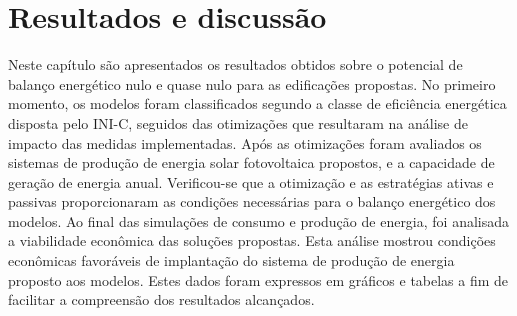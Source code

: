 \section{Resultados e discussão}
\noindent Neste capítulo são apresentados os resultados obtidos sobre o potencial de balanço energético nulo e quase nulo para as edificações propostas. No primeiro momento, os modelos foram classificados segundo a classe de eficiência energética disposta pelo INI-C, seguidos das otimizações que resultaram na análise de impacto das medidas implementadas. Após as otimizações foram avaliados os sistemas de produção de energia solar fotovoltaica propostos, e a capacidade de geração de energia anual.\vspace*{0.3cm} \newline
\noindent Verificou-se que a otimização e as estratégias ativas e passivas proporcionaram as condições necessárias para o balanço energético dos modelos. Ao final das simulações de consumo e produção de energia, foi analisada a viabilidade econômica das soluções propostas. Esta análise mostrou condições econômicas favoráveis de implantação do sistema de produção de energia proposto aos modelos.  Estes dados foram expressos em gráficos e tabelas a fim de facilitar a compreensão dos resultados alcançados.



